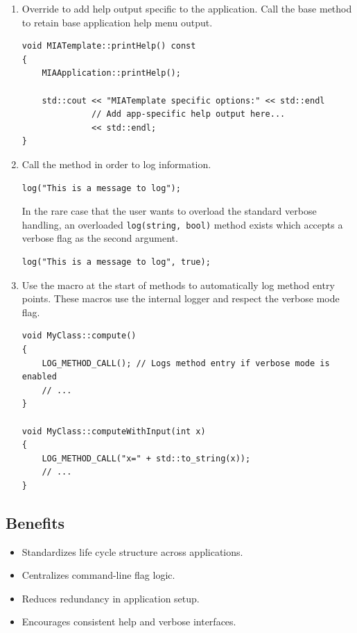 \begin{enumerate}
	\item Override  to add help output specific to the application. Call the base method to retain base application help menu output.
	\begin{lstlisting}[style=cppstyle]
void MIATemplate::printHelp() const
{
    MIAApplication::printHelp();

    std::cout << "MIATemplate specific options:" << std::endl
              // Add app-specific help output here...
              << std::endl;
}
	\end{lstlisting}

	\item Call the  method in order to log information.
	\begin{lstlisting}[style=cppstyle]
log("This is a message to log");
	\end{lstlisting}
	In the rare case that the user wants to overload the standard verbose handling, an overloaded \texttt{log(string, bool)} method exists which accepts a verbose flag as the second argument.
	\begin{lstlisting}[style=cppstyle]
log("This is a message to log", true);
	\end{lstlisting}

	 \item Use the  macro at the start of methods to automatically log method entry points. These macros use the internal logger and respect the verbose mode flag.
	\begin{lstlisting}[style=cppstyle]
void MyClass::compute()
{
    LOG_METHOD_CALL(); // Logs method entry if verbose mode is enabled
    // ...
}

void MyClass::computeWithInput(int x)
{
    LOG_METHOD_CALL("x=" + std::to_string(x));
    // ...
}
	\end{lstlisting}
\end{enumerate}

\subsection{Benefits}
\begin{itemize}\itemsep0em
	\item Standardizes life cycle structure across applications.
	\item Centralizes command-line flag logic.
	\item Reduces redundancy in application setup.
	\item Encourages consistent help and verbose interfaces.
\end{itemize}










